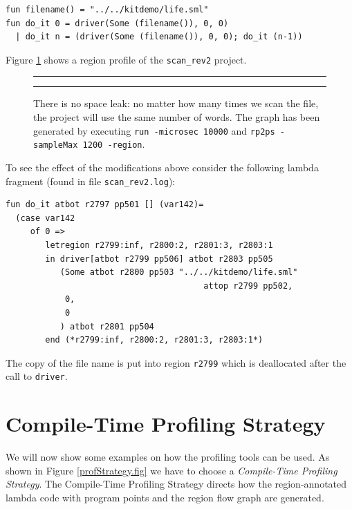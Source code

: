 \documentclass[12pt]{book}
\begin{document}
\begin{verbatim}
fun filename() = "../../kitdemo/life.sml"
fun do_it 0 = driver(Some (filename()), 0, 0)
  | do_it n = (driver(Some (filename()), 0, 0); do_it (n-1))
\end{verbatim}
\noindent
Figure \ref{scan_rev2_1.fig} shows a region profile of the
\texttt{scan\_rev2} project.

\begin{figure}[htb]
\hrule
\medskip

\begin{center}
\end{center}
  \caption{There is no space leak: no matter how many times we scan the
    file, the project will use the same number of words. The graph has been
    generated by executing \texttt{run -microsec 10000} and \texttt{rp2ps
      -sampleMax 1200 -region}.}\label{scan_rev2_1.fig}
\medskip

\hrule
\end{figure}
To see the effect of the modifications above consider the following lambda
fragment (found in file \texttt{scan\_rev2.log}):

\begin{verbatim}
fun do_it atbot r2797 pp501 [] (var142)= 
  (case var142 
     of 0 => 
        letregion r2799:inf, r2800:2, r2801:3, r2803:1 
        in driver[atbot r2799 pp506] atbot r2803 pp505 
           (Some atbot r2800 pp503 "../../kitdemo/life.sml"
                                        attop r2799 pp502, 
            0, 
            0
           ) atbot r2801 pp504 
        end (*r2799:inf, r2800:2, r2801:3, r2803:1*)
\end{verbatim}                                
\noindent
The copy of the file name is put into region \texttt{r2799} which is
deallocated after the call to \texttt{driver}.

\section{Compile-Time Profiling Strategy}

We will now show some examples on how the profiling tools can be used. As
shown in Figure \ref{profStrategy.fig} we have to choose a \emph{Compile-Time
  Profiling Strategy}. The Compile-Time
Profiling Strategy directs how the region-annotated lambda code with
program points and the region flow graph are generated.
\end{document}
